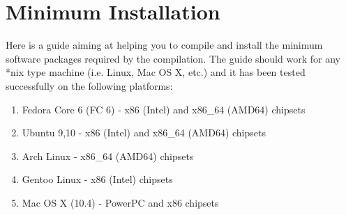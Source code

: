 \section{Minimum Installation}
Here is a guide aiming at helping you to compile \mage and install the
minimum software packages required by the \mage compilation.  The
guide should work for any *nix type machine (i.e. Linux, Mac OS X,
etc.) and it has been tested successfully on the following platforms:

\begin{enumerate}
\item {} Fedora Core 6 (FC 6) - x86 (Intel) and x86\_64 (AMD64) chipsets
\item {} Ubuntu 9,10 - x86 (Intel) and x86\_64 (AMD64) chipsets
\item {} Arch Linux - x86\_64 (AMD64) chipsets
\item {} Gentoo Linux - x86 (Intel) chipsets
\item {} Mac OS X (10.4) - PowerPC and x86 chipsets
\end{enumerate}




